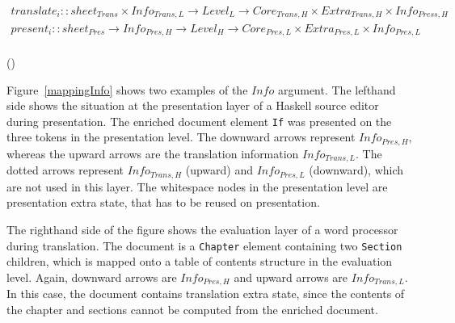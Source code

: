 \bc
\begin{small}\begin{align*}
translate_{i} :: sheet_{Trans} \times Info_{Trans,L} \rightarrow Level_{L} \rightarrow Core_{Trans,H}  \times Extra_{Trans,H}  \times Info_{Press,H}\\
present_{i} :: sheet_{Pres}  \rightarrow Info_{Pres,H} \rightarrow  Level_{H} \rightarrow Core_{Pres,L} \times Extra_{Pres,L}   \times Info_{Pres,L} \\
\end{align*} 
\end{small}
{\centering ()\\}


Figure~\ref{mappingInfo} shows two examples of the $Info$ argument. The lefthand side shows the situation at the presentation layer of a Haskell source editor during presentation.  The enriched document element \verb|If|  was presented on the three tokens in the presentation level. The downward arrows represent $Info_{Pres,H}$, whereas the upward arrows are the translation information $Info_{Trans, L}$. The dotted arrows represent $Info_{Trans,H}$ (upward) and $Info_{Pres,L}$ (downward), which are not used in this layer. The whitespace nodes in the presentation level are presentation extra state, that has to be reused on presentation. 

The righthand side of the figure shows the evaluation layer of a word processor during translation. The document is a \verb|Chapter| element containing two \verb|Section| children, which is mapped onto a table of contents structure in the evaluation level. Again, downward arrows are $Info_{Pres,H}$ and upward arrows are $Info_{Trans,L}$.  In this case, the document contains translation extra state, since the contents of the chapter and sections cannot be computed from the enriched document.  

